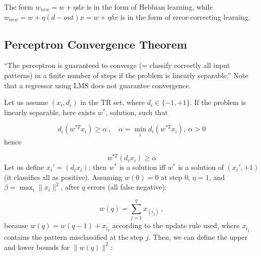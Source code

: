 The form $w_{new} = w + \eta d x$ is in the form of Hebbian learning, while $w_{new} = w + \eta (d-out) x = w + \eta \delta x$ is in the form of error-correcting learning.

\subsection{Perceptron Convergence Theorem}

``The perceptron is guaranteed to converge (= classify correctly all input patterns) in a finite number of steps if the problem is linearly separable.'' Note that a regressor using LMS does not guarantee convergence.

Let us assume $(x_i, d_i)$ in the TR set, where $d_i \in \{-1,+1\}$. If the problem is linearly separable, here exists $w^*$, solution, such that

\begin{equation*}
    d_i(w^{*T}x_i) \geq \alpha \, , \quad \alpha=\min_i d_i(w^{*T}x_i), \ \alpha > 0
\end{equation*}
hence

\begin{equation*}
    w^{*T}(d_ix_i) \geq \alpha
\end{equation*}
Let us define $x_i' = (d_ix_i)$; then $w^*$ is a solution iff $w^*$ is a solution of $(x_i', +1)$ (it classifies all as positive).  Assuming $w(0) = 0$ at step 0, $\eta = 1$, and $\beta = \max_i\|x_i\|^2$, after $q$ errors (all false negative):

\begin{equation*}
    w(q) = \sum_{j=1}^q x_{(i_j)} \, ,
\end{equation*}
because $w(q) = w(q-1) + x_{i_q}$ according to the update rule used, where $x_{i_j}$ contains the pattern misclassified at the step $j$. Then, we can define the upper and lower bounds for $\|w(q)\|^2$:

